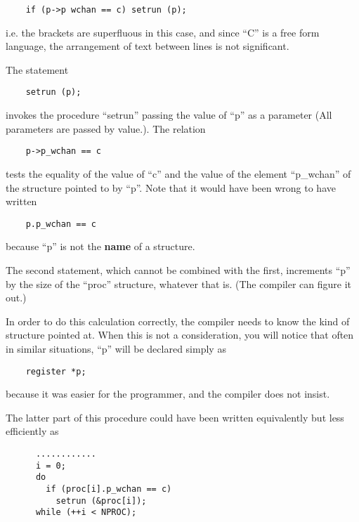 \begin{verbatim}
    if (p->p wchan == c) setrun (p);
\end{verbatim}

\noindent i.e. the brackets are superfluous in
this case, and since ``C'' is a free form
language, the arrangement of text
between lines is not significant.


\noindent The statement

\begin{verbatim}
    setrun (p);
\end{verbatim}


\noindent invokes the procedure ``setrun'' passing
the value of ``p'' as a parameter (All
parameters are passed by value.). The relation

\begin{verbatim}
    p->p_wchan == c
\end{verbatim}


\noindent tests the equality of the value of ``c''
and the value of the element ``p\_wchan''
of the structure pointed to by ``p''.
Note that it would have been wrong to
have written

\begin{verbatim}
    p.p_wchan == c
\end{verbatim}

\noindent because ``p'' is not the {\bf name} of a structure.

The second statement, which cannot be
combined with the first, increments ``p''
by the size of the ``proc'' structure,
whatever that is. (The compiler can
figure it out.)

In order to do this calculation
correctly, the compiler needs to know
the kind of structure pointed at. When
this is not a consideration, you will
notice that often in similar situations, ``p'' will be declared simply as

\begin{verbatim}
    register *p;
\end{verbatim}

\noindent because it was easier for the
programmer, and the compiler does not insist.

The latter part of this procedure could
have been written equivalently but less
efficiently as

\begin{verbatim}
      ............
      i = 0;
      do
        if (proc[i].p_wchan == c)
          setrun (&proc[i]);
      while (++i < NPROC);
\end{verbatim}

